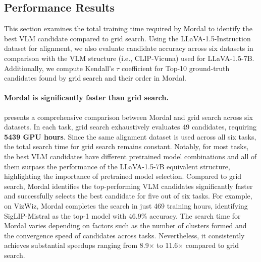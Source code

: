\subsection{Performance Results}
\label{sec:eval_performance}
This section examines the total training time required by Mordal to identify the best VLM candidate compared to grid search. Using the LLaVA-1.5-Instruction dataset for alignment, we also evaluate candidate accuracy across six datasets in comparison with the VLM structure (i.e., CLIP-Vicuna) used for LLaVA-1.5-7B. Additionally, we compute Kendall's $\tau$ coefficient for Top-10 ground-truth candidates found by grid search and their order in Mordal. 




\paragraph{Mordal is significantly faster than grid search.} 
 presents a comprehensive comparison between Mordal and grid search across six datasets. In each task, grid search exhaustively evaluates 49 candidates, requiring \textbf{5439 GPU hours}. Since the same alignment dataset is used across all six tasks, the total search time for grid search remains constant. Notably, for most tasks, the best VLM candidates have different pretrained model combinations and all of them surpass the performance of the LLaVA-1.5-7B equivalent structure, highlighting the importance of pretrained model selection. Compared to grid search, Mordal identifies the top-performing VLM candidates significantly faster and successfully selects the best candidate for five out of six tasks. For example, on VizWiz, Mordal completes the search in just 469 training hours, identifying SigLIP-Mistral as the top-1 model with 46.9\% accuracy. The search time for Mordal varies depending on factors such as the number of clusters formed and the convergence speed of candidates across tasks. Nevertheless, it consistently achieves substantial speedups ranging from 8.9$\times$ to 11.6$\times$ compared to grid search.

